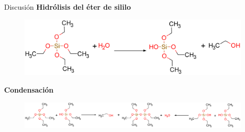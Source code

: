 \documentclass[handout]{beamer}
\begin{document}
\begin{frame}{Discusi\'on}
	\textbf{Hidr\'olisis del \'eter de sililo}
	\begin{figure}[h]
		\centering
		\includegraphics[width = 0.6\linewidth]{../structures/hidrosilicate.png}
	\end{figure}
	\textbf{Condensaci\'on}
	\begin{figure}[h]
		\centering
		\includegraphics[width = \linewidth]{../structures/polysilicate.png}
	\end{figure}
\end{frame}
\end{document}
